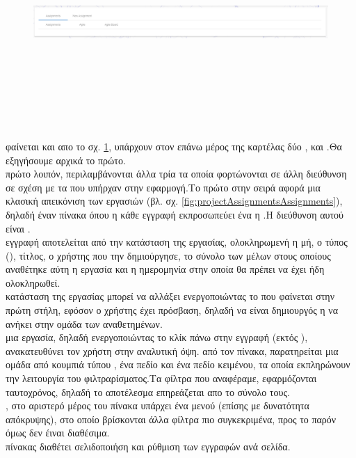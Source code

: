 \begin{figure}[!htb]
\includegraphics[width=\linewidth, height=8cm]{images/projectAssignments.png}
\caption{}
\label{fig:projectAssignments}
\end{figure}

 φαίνεται και απο το σχ. \ref{fig:projectAssignments}, υπάρχουν στον επάνω μέρος της καρτέλας δύο ,  και .Θα εξηγήσουμε αρχικά το πρώτο.\\
 πρώτο λοιπόν, περιλαμβάνονται άλλα τρία  τα οποία φορτώνονται σε άλλη διεύθυνση σε σχέση με τα  που υπήρχαν στην εφαρμογή.Το πρώτο στην σειρά αφορά μια κλασική απεικόνιση των εργασιών (βλ. σχ. \ref{fig:projectAssignmentsAssignments}), δηλαδή έναν πίνακα όπου η κάθε εγγραφή εκπροσωπεύει ένα  η .Η διεύθυνση αυτού είναι .\\
 εγγραφή αποτελείται από την κατάσταση της εργασίας, ολοκληρωμενή η μή, ο τύπος (), τίτλος, ο χρήστης που την δημιούργησε, το σύνολο των μέλων στους οποίους αναθέτηκε αύτη η εργασία και η ημερομηνία στην οποία θα πρέπει να έχει ήδη ολοκληρωθεί.\\
 κατάσταση της εργασίας μπορεί να αλλάξει ενεργοποιώντας το  που φαίνεται στην πρώτη στήλη, εφόσον ο χρήστης έχει πρόσβαση, δηλαδή να είναι δημιουργός η να ανήκει στην ομάδα των αναθετημένων.\\
 μια εργασία, δηλαδή ενεργοποιώντας το κλίκ πάνω στην εγγραφή (εκτός ), ανακατευθύνει τον χρήστη στην αναλυτική όψη.
 από τον πίνακα, παρατηρείται μια ομάδα από κουμπιά τύπου , ένα πεδίο  και ένα πεδίο κειμένου, τα οποία εκπληρώνουν την λειτουργία του φιλτραρίσματος.Τα φίλτρα που αναφέραμε, εφαρμόζονται ταυτοχρόνος, δηλαδή το αποτέλεσμα επηρεάζεται απο το σύνολο τους.\\
, στο αριστερό μέρος του πίνακα υπάρχει ένα μενού (επίσης με δυνατότητα απόκρυψης), στο οποίο βρίσκονται άλλα φίλτρα πιο συγκεκριμένα, προς το παρόν όμως δεν έιναι διαθέσιμα.\\
 πίνακας διαθέτει σελιδοποιήση και ρύθμιση των εγγραφών ανά σελίδα.

